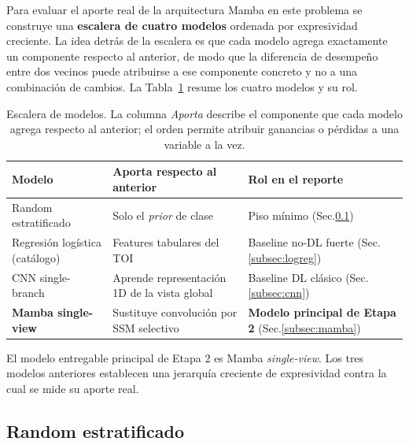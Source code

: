 \documentclass[11pt,a4paper]{article}
\begin{document}
Para evaluar el aporte real de la arquitectura Mamba en este problema se
construye una \textbf{escalera de cuatro modelos} ordenada por
expresividad creciente. La idea detrás de la escalera es que cada
modelo agrega exactamente un componente respecto al anterior, de modo
que la diferencia de desempeño entre dos vecinos puede atribuirse a
ese componente concreto y no a una combinación de cambios. La
Tabla~\ref{tab:baselines-roles} resume los cuatro modelos y su rol.

\begin{table}[H]
\centering
\caption{Escalera de modelos. La columna \textit{Aporta} describe el
componente que cada modelo agrega respecto al anterior; el orden
permite atribuir ganancias o pérdidas a una variable a la vez.}
\label{tab:baselines-roles}
\renewcommand{\arraystretch}{1.2}
\begin{tabular}{p{} p{} p{}}
\toprule
\textbf{Modelo} & \textbf{Aporta respecto al anterior} & \textbf{Rol en el reporte} \\
\midrule
Random estratificado &
  Solo el \textit{prior} de clase &
  Piso mínimo (Sec.\ref{subsec:random}) \\
\addlinespace
Regresión logística (catálogo) &
  Features tabulares del TOI &
  Baseline no-DL fuerte (Sec.\ref{subsec:logreg}) \\
\addlinespace
CNN single-branch &
  Aprende representación 1D de la vista global &
  Baseline DL clásico (Sec.\ref{subsec:cnn}) \\
\addlinespace
\textbf{Mamba single-view} &
  Sustituye convolución por SSM selectivo &
  \textbf{Modelo principal de Etapa 2} (Sec.\ref{subsec:mamba}) \\
\bottomrule
\end{tabular}
\end{table}

El modelo entregable principal de Etapa 2 es Mamba \textit{single-view}.
Los tres modelos anteriores establecen una jerarquía creciente de
expresividad contra la cual se mide su aporte real.

\subsection{Random estratificado}
\label{subsec:random}
\end{document}
